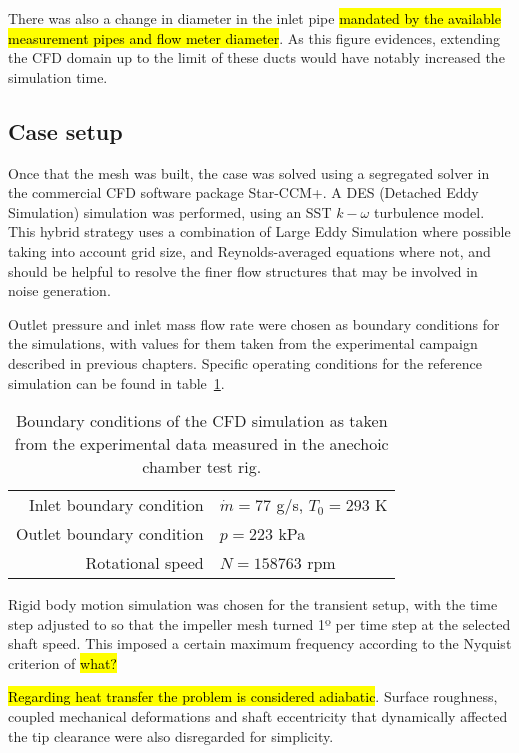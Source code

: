 There was also a change in diameter in the inlet pipe \hl{mandated by the available measurement pipes and flow meter diameter}. As this figure evidences, extending the CFD domain up to the limit of these ducts would have notably increased the simulation time.

\subsection{Case setup}

Once that the mesh was built, the case was solved using a segregated solver in the commercial CFD software package Star-CCM+. A DES (Detached Eddy Simulation) simulation was performed, using an SST $k-\omega$ turbulence model. This hybrid strategy uses a combination of Large Eddy Simulation where possible taking into account grid size, and Reynolds-averaged equations where not, and should be helpful to resolve the finer flow structures that may be involved in noise generation.

Outlet pressure and inlet mass flow rate were chosen as boundary conditions for the simulations, with values for them taken from the experimental campaign described in previous chapters. Specific operating conditions for the reference simulation can be found in table~\ref{tab:operatingConditions}.

\begin{table}
\centering
\caption{Boundary conditions of the CFD simulation as taken from the experimental data measured in the anechoic chamber test rig.}
\footnotesize
\begin{tabular}{rl}
\toprule
Inlet boundary condition & $\dot{m}=77$ g/s, $T_0=293$ K\\
Outlet boundary condition &  $p=223$ kPa \\
Rotational speed & $N=158763$ rpm \\ \bottomrule
\end{tabular}
\label{tab:operatingConditions}
\end{table}

Rigid body motion simulation was chosen for the transient setup, with the time step adjusted to so that the impeller mesh turned 1º per time step at the selected shaft speed. This imposed a certain maximum frequency according to the Nyquist criterion of \hl{what?}

\hl{Regarding heat transfer the problem is considered adiabatic}. Surface roughness, coupled mechanical deformations and shaft eccentricity that dynamically affected the tip clearance were also disregarded for simplicity.

